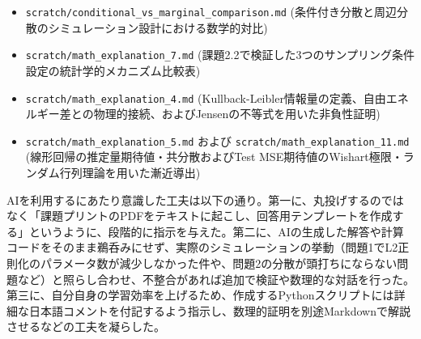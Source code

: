 \documentclass[11pt,a4paper,dvipdfmx]{article}
\numberwithin{equation}{section}
\begin{document}
\begin{proofbox}
\begin{itemize}
\begin{itemize}
        \item \texttt{scratch/conditional\_vs\_marginal\_comparison.md} (条件付き分散と周辺分散のシミュレーション設計における数学的対比)
        \item \texttt{scratch/math\_explanation\_7.md} (課題2.2で検証した3つのサンプリング条件設定の統計学的メカニズム比較表)
        \item \texttt{scratch/math\_explanation\_4.md} (Kullback-Leibler情報量の定義、自由エネルギー差との物理的接続、およびJensenの不等式を用いた非負性証明)
        \item \texttt{scratch/math\_explanation\_5.md} および \texttt{scratch/math\_explanation\_11.md} (線形回帰の推定量期待値・共分散およびTest MSE期待値のWishart極限・ランダム行列理論を用いた漸近導出)
    \end{itemize}
\end{itemize}

AIを利用するにあたり意識した工夫は以下の通り。第一に、丸投げするのではなく「課題プリントのPDFをテキストに起こし、回答用テンプレートを作成する」というように、段階的に指示を与えた。第二に、AIの生成した解答や計算コードをそのまま鵜呑みにせず、実際のシミュレーションの挙動（問題1でL2正則化のパラメータ数が減少しなかった件や、問題2の分散が頭打ちにならない問題など）と照らし合わせ、不整合があれば追加で検証や数理的な対話を行った。第三に、自分自身の学習効率を上げるため、作成するPythonスクリプトには詳細な日本語コメントを付記するよう指示し、数理的証明を別途Markdownで解説させるなどの工夫を凝らした。
\end{proofbox}
\end{document}
